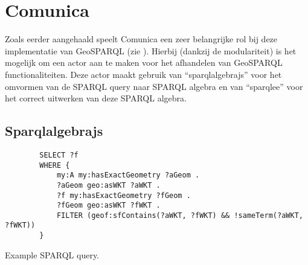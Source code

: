 \section{Comunica}
\label{sec:impl_comunica}
Zoals eerder aangehaald speelt Comunica een zeer belangrijke rol bij deze implementatie van GeoSPARQL (zie ). Hierbij (dankzij de modulariteit) is het mogelijk om een actor aan te maken voor het afhandelen van GeoSPARQL functionaliteiten. Deze actor maakt gebruik van ``sparqlalgebrajs'' voor het omvormen van de SPARQL query naar SPARQL algebra en van ``sparqlee'' voor het correct uitwerken van deze SPARQL algebra. 

\subsection{Sparqlalgebrajs}
\begin{listing}[ht]
    \begin{verbatim}
        SELECT ?f
        WHERE {
            my:A my:hasExactGeometry ?aGeom .
            ?aGeom geo:asWKT ?aWKT .
            ?f my:hasExactGeometry ?fGeom .
            ?fGeom geo:asWKT ?fWKT .
            FILTER (geof:sfContains(?aWKT, ?fWKT) && !sameTerm(?aWKT, ?fWKT))
        }
    \end{verbatim}
    \caption{Example SPARQL query.}
    \label{listing:sparqlalgebrajs_query}
\end{listing}

